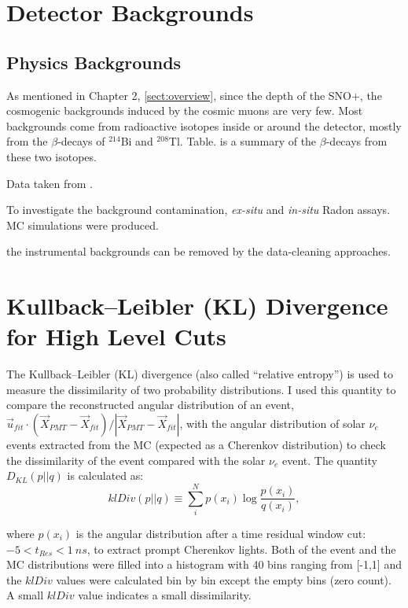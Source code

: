 \section{Detector Backgrounds}

\subsection{Physics Backgrounds}
As mentioned in Chapter 2, \ref{sect:overview}, since the depth of the SNO+, the cosmogenic backgrounds induced by the cosmic muons are very few. Most backgrounds come from radioactive isotopes inside or around the detector, mostly from the $\beta$-decays of $^{214}$Bi and $^{208}$Tl. Table. is a summary of the $\beta$-decays from these two isotopes. 

Data taken from \cite{nndc}.

To investigate the background contamination, \emph{ex-situ} and \emph{in-situ} Radon assays.
MC simulations were produced.


the instrumental backgrounds can be removed by the data-cleaning approaches.


\section{Kullback–Leibler (KL) Divergence for High Level Cuts}

The Kullback–Leibler (KL) divergence (also called ``relative entropy'') is used to measure the dissimilarity of two probability distributions\cite{murphy2012machine}. I used this quantity to compare the reconstructed angular distribution of an event, $\vec{u}_{fit}\cdot(\vec{X}_{PMT}-\vec{X}_{fit})/|\vec{X}_{PMT}-\vec{X}_{fit}|$, with the angular distribution of solar $\nu_e$ events extracted from the MC (expected as a Cherenkov distribution) to check the dissimilarity of the event compared with the solar $\nu_e$ event. The quantity $D_{KL}(p||q)$ is calculated as: 
\begin{equation}\label{eq:kldiv}
klDiv(p||q) \equiv \sum_{i}^N p(x_i)\log{\frac{p(x_i)}{q(x_i)}},
\end{equation}

where $p(x_i)$ is the angular distribution after a time residual window cut: $-5<t_{Res}<1~ns$, to extract prompt Cherenkov lights. Both of the event and the MC distributions were filled into a histogram with 40 bins ranging from [-1,1] and the $klDiv$ values were calculated bin by bin except the empty bins (zero count). A small $klDiv$ value indicates a small dissimilarity.

